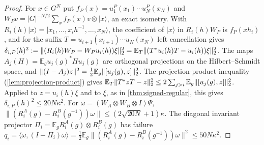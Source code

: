 \begin{proof}
For $x\in G^N$ put $f_P(x)=u^P_1(x_1)\cdots u^P_N(x_N)$ and $W_Pv=|G|^{-N/2}\sum_xf_P(x)v\otimes|x\rangle$, an exact isometry.
With $R_i(h)|x\rangle=|x_1,\dots,x_ih^{-1},\dots,x_N\rangle$, the coefficient of $|x\rangle$ in $R_i(h)W_P$ is $f_P(xh_i)$,
and for the suffix $T=u_{i+1}(x_{i+1})\cdots u_N(x_N)$ left cancellation gives
$\delta_{i,P}(h)^2:=\lVert (R_i(h)W_P-W_Pu_i(h))\xi\rVert_2^2=\mathbb E_T\lVert (T^*u_i(h)T-u_i(h))\xi\rVert_2^2$. The maps
$A_j(H)=\mathbb E_gu_j(g)^*Hu_j(g)$ are orthogonal projections on the Hilbert--Schmidt space, and
$\|(I-A_j)z\|^2=\frac12\mathbb E_g\lVert [u_j(g),z]\rVert_2^2$. The projection-product inequality (\cref{lem:projection-product})
gives $\mathbb E_T\lVert T^*zT-z\rVert_2^2\le2\sum_{j>i}\mathbb E_g\lVert [u_j(g),z]\rVert_2^2$. Applied to $z=u_i(h)\xi$ and to $\xi$, as in
\cref{thm:signed-regular}, this gives $\delta_{i,P}(h)^2\le20N\kappa^2$. For $\omega=(W_A\otimes W_B\otimes I)\Psi$,
$\|(R^A_i(g)-R^B_i(g^{-1}))\omega\|\le(2\sqrt{20N}+1)\kappa$. The diagonal invariant projector
$\Pi_i=\mathbb E_gR^A_i(g)\otimes R^B_i(g)$ has failure
$q_i=\langle\omega,(I-\Pi_i)\omega\rangle=\frac12\mathbb E_g\|(R^A_i(g)-R^B_i(g^{-1}))\omega\|^2\le50N\kappa^2$.


\end{proof}
